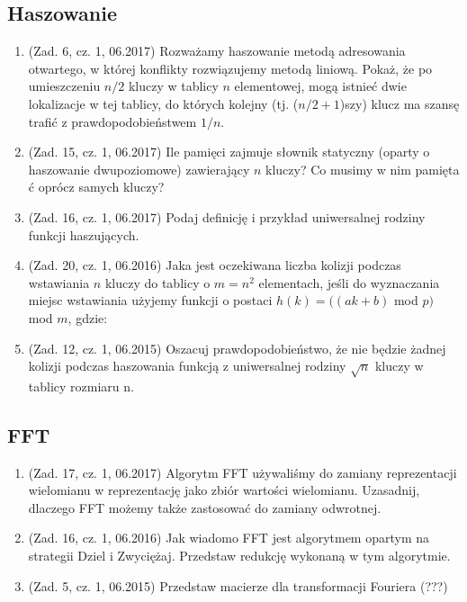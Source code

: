 \documentclass[10pt]{article}%
\begin{document}
\subsection*{Haszowanie}

\begin{enumerate}

\item (Zad. 6, cz. 1, 06.2017) Rozważamy haszowanie metodą adresowania otwartego, w której konflikty rozwiązujemy metodą liniową. Pokaż, że po umieszczeniu $n/2$ kluczy w tablicy $n$ elementowej, mogą istnieć dwie lokalizacje w tej tablicy, do których kolejny (tj. ($n/2 + 1$)szy) klucz ma szansę trafić z prawdopodobieństwem $1/n$.

\item (Zad. 15, cz. 1, 06.2017) Ile pamięci zajmuje słownik statyczny (oparty o haszowanie dwupoziomowe) zawierający $n$ kluczy? Co musimy w nim pamięta ć oprócz samych kluczy?

\item (Zad. 16, cz. 1, 06.2017) Podaj definicję i przykład uniwersalnej rodziny funkcji haszujących.

\item (Zad. 20, cz. 1, 06.2016) Jaka jest oczekiwana liczba kolizji podczas wstawiania $n$ kluczy do tablicy o $ m = n^2 $ elementach, jeśli do wyznaczania miejsc wstawiania użyjemy funkcji o postaci $h(k) = ((ak + b)$ mod $p)$ mod $m$, gdzie:

\item (Zad. 12, cz. 1, 06.2015) Oszacuj prawdopodobieństwo, że nie będzie żadnej kolizji podczas haszowania funkcją z uniwersalnej rodziny $\sqrt{n}$ kluczy w tablicy rozmiaru n. 

\end{enumerate}


\subsection*{FFT}

\begin{enumerate}

\item (Zad. 17, cz. 1, 06.2017) Algorytm FFT używaliśmy do zamiany reprezentacji wielomianu w reprezentację jako zbiór wartości wielomianu. Uzasadnij, dlaczego FFT możemy także zastosować do zamiany odwrotnej.

\item (Zad. 16, cz. 1, 06.2016) Jak wiadomo FFT jest algorytmem opartym na strategii Dziel i Zwyciężaj. Przedstaw redukcję wykonaną w tym algorytmie.

\item (Zad. 5, cz. 1, 06.2015) Przedstaw macierze dla transformacji Fouriera (???)

\end{enumerate}
\end{document}
